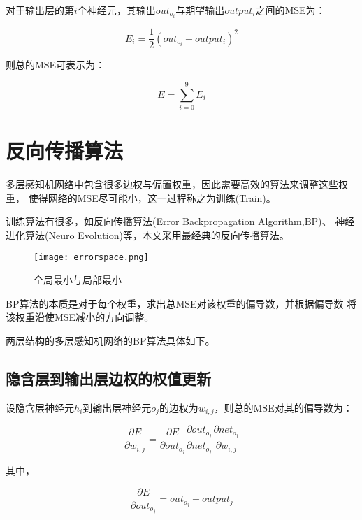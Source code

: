 \documentclass[forprint]{WHUBachelor}
\begin{document}
    对于输出层的第$i$个神经元，其输出$out_{o_i}$与期望输出$output_i$之间的MSE为：

    \begin{equation}
      E_i=\frac{1}{2} (out_{o_i}-output_i)^2
    \end{equation}

    则总的MSE可表示为：

    \begin{equation}
      E=\sum_{i=0}^{9}{E_i}
    \end{equation}

  \section{反向传播算法}

    多层感知机网络中包含很多边权与偏置权重，因此需要高效的算法来调整这些权重，
    使得网络的MSE尽可能小，这一过程称之为训练(Train)。

    训练算法有很多，如反向传播算法(Error Backpropagation Algorithm,BP)、
    神经进化算法(Neuro Evolution)等，本文采用最经典的反向传播算法。

    \begin{figure}[ht]
      \centering
        \texttt{[image: errorspace.png]}
        \caption{全局最小与局部最小}
        \label{fig:3}
    \end{figure}

    BP算法的本质是对于每个权重，求出总MSE对该权重的偏导数，并根据偏导数
    将该权重沿使MSE减小的方向调整。

    两层结构的多层感知机网络的BP算法具体如下。

    \subsection{隐含层到输出层边权的权值更新}
      
      设隐含层神经元$h_i$到输出层神经元$o_j$的边权为$w_{i,j}$，则总的MSE对其的偏导数为：

      \begin{equation}
        \frac{\partial{E}}{\partial{w_{i,j}}}=
        \frac{\partial{E}}{\partial{out_{o_j}}}
        \frac{\partial{out_{o_j}}}{\partial{net_{o_j}}}
        \frac{\partial{net_{o_j}}}{\partial{w_{i,j}}}
        \label{equa11}
      \end{equation}

      其中，

      \begin{equation}
        \frac{\partial{E}}{\partial{out_{o_j}}}
        =out_{o_j}-output_j
        \label{equa12}
      \end{equation}
\end{document}
